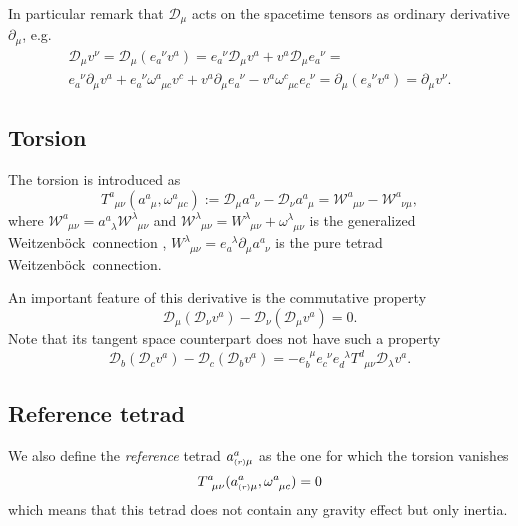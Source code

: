 \documentclass[
10pt, %
a4paper, %
oneside, %
headinclude,footinclude, %
BCOR5mm, %
]{scrartcl}
\newcommand{\pd}{\partial}
\newcommand{\itetr}[2]{e^{\phantom{#2}#1}_{#2}}
\newcommand{\tetr}[2]{a^{#1}_{\phantom{#1}#2}}
\newcommand{\rtetr}[2]{a^{#1}_{\mathsmaller{(r)} #2}}
\newcommand{\spin}[2]{\omega^{#1}_{\phantom{#1}#2}}
\newcommand{\D}[1]{\mathcal{D}_{#1}} %
\newcommand{\Tors}[2]{T^{#1}_{\phantom{a}#2}}
\newcommand{\W}[2]{\mathcal{W}^{#1}_{\phantom{#1}#2}}
\newcommand{\w}[2]{W^{#1}_{\phantom{#1}#2}}
\newcommand{\We}{Weitzenb\"ock}
\begin{document}
In particular remark that $ \D{\mu} $ acts on the spacetime tensors as ordinary derivative $ 
\pd_\mu $, e.g.
\begin{multline}\label{eqn.covD.pd}
\D{\mu}v^{\nu} = \D{\mu}(\itetr{\nu}{a}v^a) = \itetr{\nu}{a}\D{\mu}v^a + v^a\D{\mu}\itetr{\nu}{a} = 
\\
\itetr{\nu}{a}\pd_{\mu}v^a + \itetr{\nu}{a}\spin{a}{\mu c}v^c + 
v^a\pd_{\mu}\itetr{\nu}{a} - v^a\spin{c}{\mu c}\itetr{\nu}{c} = \pd_\mu(\itetr{\nu}{s}v^a) = 
\pd_\mu v^\nu.
\end{multline}



\subsection{Torsion}

The torsion is introduced as
\begin{equation}
\Tors{a}{\mu\nu}(\tetr{a}{\mu},\spin{a}{\mu c}):=\D{\mu}\tetr{a}{\nu} - \D{\nu}\tetr{a}{\mu} = 
\W{a}{\mu\nu} - \W{a}{\nu\mu},
\end{equation}
where $ \W{a}{\mu\nu} = \tetr{a}{\lambda}\W{\lambda}{\mu\nu}$ and $ \W{\lambda}{\mu\nu} = 
\w{\lambda}{\mu\nu} + \spin{\lambda}{\mu\nu}$ is the 
generalized \We\ connection \cite{AldrovandiPereiraBook}, $ \w{\lambda}{\mu\nu} = 
\itetr{\lambda}{a}\pd_\mu \tetr{a}{\nu}$ is 
the pure tetrad \We\ connection.


An important feature of this derivative is the commutative property
\begin{equation}\label{eqn.commut.D}
\D{\mu}(\D{\nu} v^a) - \D{\nu}(\D{\mu} v^a) = 0.
\end{equation}
Note that its tangent space counterpart does not have such a property
\begin{equation}
\D{b}(\D{c} v^a) - \D{c}(\D{b} v^a) = 
-\itetr{\mu}{b}\itetr{\nu}{c}\itetr{\lambda}{d}\Tors{d}{\mu\nu}\D{\lambda}v^a .
\end{equation}

\subsection{Reference tetrad}

We also define the \textit{reference} tetrad $ \rtetr{a}{\mu}$ as the one for which 
the torsion 
vanishes
\begin{equation}
\Tors{a}{\mu\nu}(\rtetr{a}{\mu},\spin{a}{\mu c}) = 0
\end{equation}
which means that this tetrad does not contain any gravity effect but only inertia.
\end{document}

